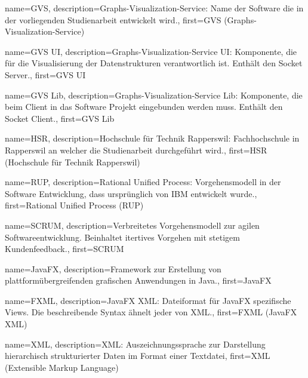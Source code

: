 



{
	name={GVS},
	description={Graphs-Visualization-Service: Name der Software die in der vorliegenden Studienarbeit entwickelt wird.},
	first={GVS (Graphs-Visualization-Service)}
}

{
	name={GVS UI},
	description={Graphs-Visualization-Service UI: Komponente, die für die Visualisierung der Datenstrukturen verantwortlich ist. Enthält den Socket Server.},
	first={GVS UI}
}

{
	name={GVS Lib},
	description={Graphs-Visualization-Service Lib: Komponente, die beim Client in das Software Projekt eingebunden werden muss. Enthält den Socket Client.},
	first={GVS Lib}
}


{
	name={HSR},
	description={Hochschule für Technik Rapperswil: Fachhochschule in Rapperswil an welcher die Studienarbeit durchgeführt wird.},
	first={HSR (Hochschule für Technik Rapperswil)}
}

{
	name={RUP},
	description={Rational Unified Process: Vorgehensmodell in der Software Entwicklung, dass ursprünglich von IBM entwickelt wurde.},
	first={Rational Unified Process (RUP)}
}

{
	name={SCRUM},
	description={Verbreitetes Vorgehensmodell zur agilen Softwareentwicklung. Beinhaltet itertives Vorgehen mit stetigem Kundenfeedback.},
	first={SCRUM}
}

{
	name={JavaFX},
	description={Framework zur Erstellung von plattformübergreifenden grafischen Anwendungen in Java.},
	first={JavaFX}
}

{
	name={FXML},
	description={JavaFX XML: Dateiformat für JavaFX spezifische Views. Die beschreibende Syntax ähnelt jeder von XML.},
	first={FXML (JavaFX XML)}
}

{
	name={XML},
	description={XML: Auszeichnungssprache zur Darstellung hierarchisch strukturierter Daten im Format einer Textdatei},
	first={XML (Extensible Markup Language)}
}

